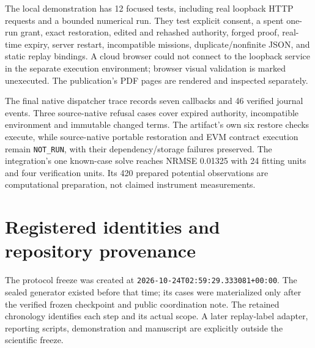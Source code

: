 \documentclass[11pt,letterpaper]{article}
\begin{document}
The local demonstration has 12 focused tests, including real loopback HTTP requests and a bounded numerical run. They test explicit consent, a spent one-run grant, exact restoration, edited and rehashed authority, forged proof, real-time expiry, server restart, incompatible missions, duplicate/nonfinite JSON, and static replay bindings. A cloud browser could not connect to the loopback service in the separate execution environment; browser visual validation is marked unexecuted. The publication's PDF pages are rendered and inspected separately.

The final native dispatcher trace records seven callbacks and 46 verified journal events. Three source-native refusal cases cover expired authority, incompatible environment and immutable changed terms. The artifact's own six restore checks execute, while source-native portable restoration and EVM contract execution remain \texttt{NOT\_RUN}, with their dependency/storage failures preserved. The integration's one known-case solve reaches NRMSE 0.01325 with 24 fitting units and four verification units. Its 420 prepared potential observations are computational preparation, not claimed instrument measurements.

\section{Registered identities and repository provenance}

The protocol freeze was created at \texttt{2026-10-24T02:59:29.333081+00:00}. The sealed generator existed before that time; its cases were materialized only after the verified frozen checkpoint and public coordination note. The retained chronology identifies each step and its actual scope. A later replay-label adapter, reporting scripts, demonstration and manuscript are explicitly outside the scientific freeze.

\begin{description}[style=nextline,leftmargin=0pt,labelwidth=0pt,labelsep=0pt,font=\normalfont\bfseries]
\item[Scientific source and protocol freeze (39 files)]
\item[Preconfirmation complete checkpoint ZIP]
\item[Original sealed generator archive]
\item[Recorded 768 primary outcomes]
\item[Timing-independent scientific record digest]
\end{description}
\end{document}
